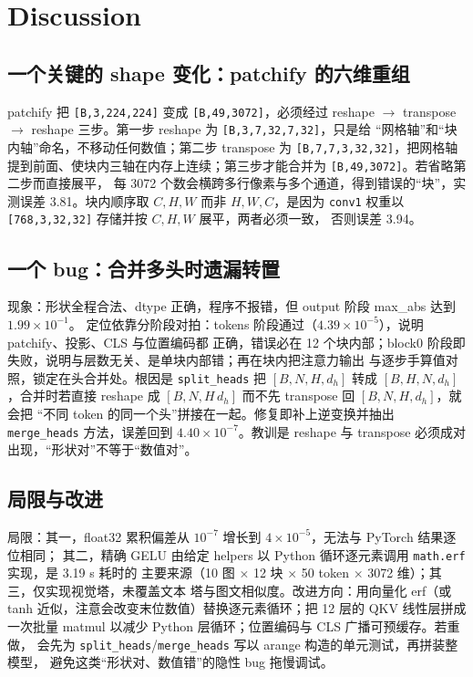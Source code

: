 \documentclass[a4paper,12pt]{article}
\begin{document}
\section{Discussion}

\subsection{一个关键的 shape 变化：patchify 的六维重组}

patchify 把 \texttt{[B,3,224,224]} 变成 \texttt{[B,49,3072]}，必须经过
reshape $\to$ transpose $\to$ reshape 三步。第一步 reshape 为 \texttt{[B,3,7,32,7,32]}，只是给
“网格轴”和“块内轴”命名，不移动任何数值；第二步 transpose 为 \texttt{[B,7,7,3,32,32]}，把网格轴
提到前面、使块内三轴在内存上连续；第三步才能合并为 \texttt{[B,49,3072]}。若省略第二步而直接展平，
每 3072 个数会横跨多行像素与多个通道，得到错误的“块”，实测误差 3.81。块内顺序取 $C,H,W$ 而非
$H,W,C$，是因为 \texttt{conv1} 权重以 \texttt{[768,3,32,32]} 存储并按 $C,H,W$ 展平，两者必须一致，
否则误差 3.94。

\subsection{一个 bug：合并多头时遗漏转置}

现象：形状全程合法、dtype 正确，程序不报错，但 output 阶段 max\_abs 达到 $1.99\times10^{-1}$。
定位依靠分阶段对拍：tokens 阶段通过（$4.39\times10^{-5}$），说明 patchify、投影、CLS 与位置编码都
正确，错误必在 12 个块内部；block0 阶段即失败，说明与层数无关、是单块内部错；再在块内把注意力输出
与逐步手算值对照，锁定在头合并处。根因是 \texttt{split\_heads} 把 $[B,N,H,d_h]$ 转成
$[B,H,N,d_h]$，合并时若直接 reshape 成 $[B,N,H\,d_h]$ 而不先 transpose 回 $[B,N,H,d_h]$，就会把
“不同 token 的同一个头”拼接在一起。修复即补上逆变换并抽出 \texttt{merge\_heads} 方法，误差回到
$4.40\times10^{-7}$。教训是 reshape 与 transpose 必须成对出现，“形状对”不等于“数值对”。

\subsection{局限与改进}

局限：其一，float32 累积偏差从 $10^{-7}$ 增长到 $4\times10^{-5}$，无法与 PyTorch 结果逐位相同；
其二，精确 GELU 由给定 helpers 以 Python 循环逐元素调用 \texttt{math.erf} 实现，是 3.19 s 耗时的
主要来源（10 图 $\times$ 12 块 $\times$ 50 token $\times$ 3072 维）；其三，仅实现视觉塔，未覆盖文本
塔与图文相似度。改进方向：用向量化 erf（或 tanh 近似，注意会改变末位数值）替换逐元素循环；把
12 层的 QKV 线性层拼成一次批量 matmul 以减少 Python 层循环；位置编码与 CLS 广播可预缓存。若重做，
会先为 \texttt{split\_heads}/\texttt{merge\_heads} 写以 arange 构造的单元测试，再拼装整模型，
避免这类“形状对、数值错”的隐性 bug 拖慢调试。
\end{document}
